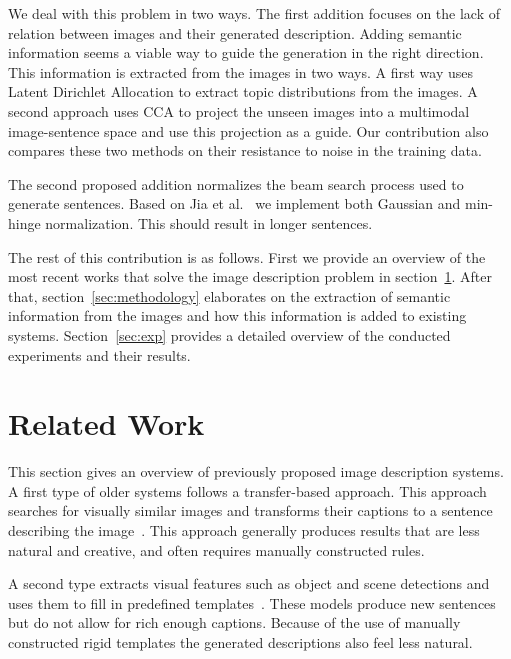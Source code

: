 \documentclass[twoside,twocolumn]{article}
\begin{document}
We deal with this problem in two ways. The first addition focuses on the lack of relation between images and their generated description. Adding semantic information seems a viable way to guide the generation in the right direction. This information is extracted from the images in two ways. A first way uses Latent Dirichlet Allocation to extract topic distributions from the images. A second approach uses CCA to project the unseen images into a multimodal image-sentence space and use this projection as a guide. Our contribution also compares these two methods on their resistance to noise in the training data.

The second proposed addition normalizes the beam search process used to generate sentences. Based on Jia et al.~\cite{Fernando2015} we implement both Gaussian and min-hinge normalization. This should result in longer sentences.

The rest of this contribution is as follows. First we provide an overview of the most recent works that solve the image description problem in section~\ref{sec:related}. After that, section~\ref{sec:methodology} elaborates on the extraction of semantic information from the images and how this information is added to existing systems. Section~\ref{sec:exp} provides a detailed overview of the conducted experiments and their results. 

\section{Related Work}
\label{sec:related}
This section gives an overview of previously proposed image description systems.
A first type of older systems follows a transfer-based approach. This approach searches for visually similar images and transforms their captions to a sentence describing the image~\cite{Devlin2015a,Hodosh2013,Kuznetsova2012,Ordonez2011}.
This approach generally produces results that are less natural and creative, and often requires manually constructed rules.

A second type extracts visual features such as object and scene detections and uses them to fill in predefined templates~\cite{Farhadi2010,Mitchell2012,Yang2011}. These models produce new sentences but do not allow for rich enough captions.
Because of the use of manually constructed rigid templates the generated descriptions also feel less natural. 
\end{document}
